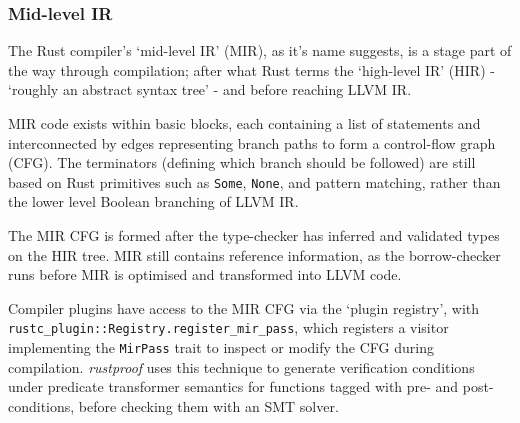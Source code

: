 \subsubsection{Mid-level IR}\label{bg:rust:mir}
The Rust compiler's `mid-level IR' (MIR), as it's name suggests, is a stage part of the way through compilation; after what Rust terms the `high-level IR' (HIR) - `roughly an abstract syntax tree' - and before reaching LLVM IR. \cite{rust_mir}

MIR code exists within basic blocks, each containing a list of statements and interconnected by edges representing branch paths to form a control-flow graph (CFG). The terminators (defining which branch should be followed) are still based on Rust primitives such as \texttt{Some}, \texttt{None}, and pattern matching, rather than the lower level Boolean branching of LLVM IR. \cite{rust_mir}

The MIR CFG is formed after the type-checker has inferred and validated types on the HIR tree. MIR still contains reference information, as the borrow-checker runs before MIR is optimised and transformed into LLVM code. \cite{rust_mir}

Compiler plugins have access to the MIR CFG via the `plugin registry', with \texttt{rustc_plugin::Registry.register_mir_pass}, which registers a visitor implementing the \texttt{MirPass} trait to inspect or modify the CFG during compilation. \emph{rustproof} uses this technique to generate verification conditions under predicate transformer semantics for functions tagged with pre- and post-conditions, before checking them with an SMT solver. \cite{rust_rustproof}

